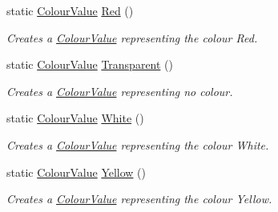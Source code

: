 \begin{DoxyCompactItemize}
static \hyperlink{classMezzanine_1_1ColourValue}{ColourValue} \hyperlink{classMezzanine_1_1ColourValue_af898e5dba8591563a3ff438858f2cda2}{Red} ()
\begin{DoxyCompactList}\small\item\em Creates a \hyperlink{classMezzanine_1_1ColourValue}{ColourValue} representing the colour Red. \item\end{DoxyCompactList}\item 
static \hyperlink{classMezzanine_1_1ColourValue}{ColourValue} \hyperlink{classMezzanine_1_1ColourValue_ade119745c9a6bf14bbe188356891baa4}{Transparent} ()
\begin{DoxyCompactList}\small\item\em Creates a \hyperlink{classMezzanine_1_1ColourValue}{ColourValue} representing no colour. \item\end{DoxyCompactList}\item 
static \hyperlink{classMezzanine_1_1ColourValue}{ColourValue} \hyperlink{classMezzanine_1_1ColourValue_a68cd34992e473676b9cf40a5f7ef75c3}{White} ()
\begin{DoxyCompactList}\small\item\em Creates a \hyperlink{classMezzanine_1_1ColourValue}{ColourValue} representing the colour White. \item\end{DoxyCompactList}\item 
static \hyperlink{classMezzanine_1_1ColourValue}{ColourValue} \hyperlink{classMezzanine_1_1ColourValue_a0f78fead16c36124a2ecbb14de1bacc3}{Yellow} ()
\begin{DoxyCompactList}\small\item\em Creates a \hyperlink{classMezzanine_1_1ColourValue}{ColourValue} representing the colour Yellow. \item\end{DoxyCompactList}\end{DoxyCompactItemize}
